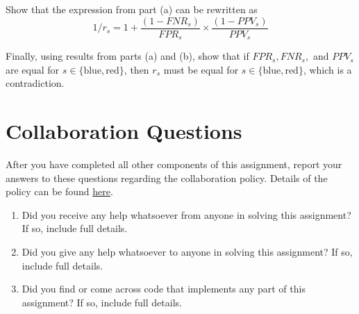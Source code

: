 \documentclass[11pt,addpoints,answers]{exam}
\begin{document}
\begin{questions}
\begin{parts}
\begin{subparts}
    \begin{your_solution}[width = \linewidth,height=10cm]
    \end{your_solution}

    \subpart[4] Show that the expression from part (a) can be rewritten as $$1/r_s =1 + \frac{(1-FNR_s)}{FPR_s} \times \frac{(1-PPV_s)}{PPV_s} $$

    \begin{your_solution}[width = \linewidth,height=10cm]
    \end{your_solution}
    \newpage
    \subpart[4] Finally, using results from parts (a) and (b), show that if $FPR_s, FNR_s,$ and $PPV_s$ are equal for $s \in \{\text{blue}, \text{red}\}$, then $r_s$ must be equal for $s \in \{\text{blue}, \text{red}\}$, which is a contradiction.

    \begin{your_solution}[width = \linewidth,height=10cm]
    \end{your_solution}
\end{subparts}


\end{parts} 
\newpage
\section{Collaboration Questions}
After you have completed all other components of this assignment, report your answers to these questions regarding the collaboration policy. Details of the policy can be found \href{http://www.cs.cmu.edu/~mgormley/courses/10601/syllabus.html}{here}.
\begin{enumerate}
    \item Did you receive any help whatsoever from anyone in solving this assignment? If so, include full details.
    \item Did you give any help whatsoever to anyone in solving this assignment? If so, include full details.
    \item Did you find or come across code that implements any part of this assignment? If so, include full details.
\end{enumerate}

\begin{your_solution}[height=6cm]

\end{your_solution}
\end{questions}
\end{document}
